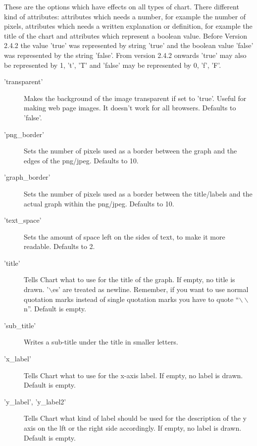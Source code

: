    
\label{options}
\Attributes
These are the options which have effects on all types of chart. 
There different kind of attributes: attributes which needs a number, for example the
number of pixels, attributes which needs a written explanation or definition,
for example the title of the chart and attributes which represent a boolean value.
Before Version 2.4.2 the value 'true' was represented by string 'true' and
the boolean value 'false' was represented by the string 'false'.
From version 2.4.2 onwards 'true' may also be represented by 1, 't', 'T' and
'false' may be represented by 0, 'f', 'F'.

\begin{description}
\item ['transparent']Makes the background of the image transparent if set to 'true'. 
                    Useful for making web page images. 
                    It doesn't work for all browsers. 
                    Defaults to 'false'.

\item ['png\_border']Sets the number of pixels 
                     used as a border between the graph and the edges of the png/jpeg. 
                     Defaults to 10.
                     
\item ['graph\_border']
        Sets the number of pixels used as a border between the title/labels 
        and the actual graph within the png/jpeg. Defaults to 10.

\item['text\_space']
       Sets the amount of space left on the sides of text, to make it more readable.  Defaults to 2.

\item['title']Tells Chart what to use for the title of the graph.  
      If empty, no title is drawn.  
      '$\backslash$es' are treated as newline. 
      Remember, if you want to use normal quotation marks instead of single quotation marks 
      you have to quote "`$\backslash\backslash$n"'. Default is empty.

\item['sub\_title']Writes a sub-title under the title in smaller letters.

\item['x\_label']Tells Chart what to use for the x-axis label.  
                 If empty, no label is drawn.  Default is empty.
                 
\item['y\_label', 'y\_label2']Tells Chart what kind of label should be used for the description
          of the y axis on the lft or the right side accordingly.  
          If empty, no label is drawn.  Default is empty.


\end{description}
